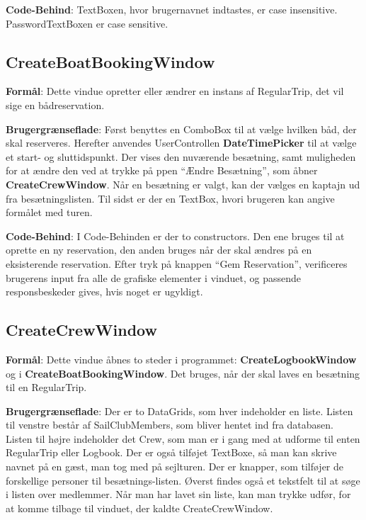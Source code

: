 \textbf{Code-Behind}: 
TextBoxen, hvor brugernavnet indtastes, er case insensitive.
PasswordTextBoxen er case sensitive. 

\subsection{CreateBoatBookingWindow}
\textbf{Formål}: 
Dette vindue opretter eller ændrer en instans af RegularTrip, det vil sige en bådreservation. 

\textbf{Brugergrænseflade}: 
Først benyttes en ComboBox til at vælge hvilken båd, der skal reserveres.
Herefter anvendes UserControllen \textbf{DateTimePicker} til at vælge et start- og sluttidspunkt.
Der vises den nuværende besætning, samt muligheden for at ændre den ved at trykke på ppen ``Ændre Besætning'', som åbner \textbf{CreateCrewWindow}.
Når en besætning er valgt, kan der vælges en kaptajn ud fra besætningslisten.
Til sidst er der en TextBox, hvori brugeren kan angive formålet med turen.

\textbf{Code-Behind}: 
I Code-Behinden er der to constructors. 
Den ene bruges til at oprette en ny reservation, den anden bruges når der skal ændres på en eksisterende reservation. 
Efter tryk på knappen ``Gem Reservation'', verificeres brugerens input fra alle de grafiske elementer i vinduet, og passende responsbeskeder gives, hvis noget er ugyldigt.

\subsection{CreateCrewWindow}

\textbf{Formål}: Dette vindue åbnes to steder i programmet: \textbf{CreateLogbookWindow} og i \textbf{CreateBoatBookingWindow}. 
Det bruges, når der skal laves en besætning til en RegularTrip.  

\textbf{Brugergrænseflade}: 
Der er to DataGrids, som hver indeholder en liste. 
Listen til venstre består af SailClubMembers, som bliver hentet ind fra databasen. 
Listen til højre indeholder det Crew, som man er i gang med at udforme til enten RegularTrip eller Logbook. 
Der er også tilføjet TextBoxe, så man kan skrive navnet på en gæst, man tog med på sejlturen. 
Der er knapper, som tilføjer de forskellige personer til besætnings-listen. 
Øverst findes også et tekstfelt til at søge i listen over medlemmer. 
Når man har lavet sin liste, kan man trykke udfør, for at komme tilbage til vinduet, der kaldte CreateCrewWindow.

